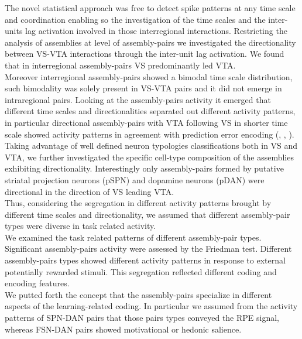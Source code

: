 The novel statistical approach was free to detect spike patterns at any time scale and coordination enabling so the investigation of the time scales and the inter-units lag activation involved in those interregional interactions. %
Restricting the analysis of assemblies at level of assembly-pairs we investigated the directionality between VS-VTA interactions through the inter-unit lag activation. %
We found that in interregional assembly-pairs VS predominantly led VTA.\\Moreover interregional assembly-pairs showed a bimodal time scale distribution, such bimodality was solely present in VS-VTA pairs and it did not emerge in intraregional pairs. Looking at the assembly-pairs activity it emerged that different time scales and directionalities separated out different activity patterns, in particular directional assembly-pairs with VTA following VS in shorter time scale showed activity patterns in agreement with prediction error encoding (\cite{Tobler2003}, \cite{Nomoto2010}, \cite{Schultz2016}).\\Taking advantage of well defined neuron typologies classifications both in VS and VTA, we further investigated the specific cell-type composition of the assemblies exhibiting directionality. Interestingly only assembly-pairs formed by putative striatal projection neurons (pSPN) and dopamine neurons (pDAN) were directional in the direction of VS leading VTA.\\Thus, considering the segregation in different activity patterns brought by different time scales and directionality, we assumed that different assembly-pair types were diverse in task related activity.\\We examined the task related patterns of different assembly-pair types. Significant assembly-pairs activity were assessed by the Friedman test. Different assembly-pairs types showed different activity patterns in response to external potentially rewarded stimuli. This segregation reflected different coding and encoding features.\\We putted forth the concept that the assembly-pairs specialize in different aspects of the learning-related coding. In particular we assumed from the activity patterns of SPN-DAN pairs that those pairs types conveyed the RPE signal, whereas FSN-DAN pairs showed motivational or hedonic salience.\\%
